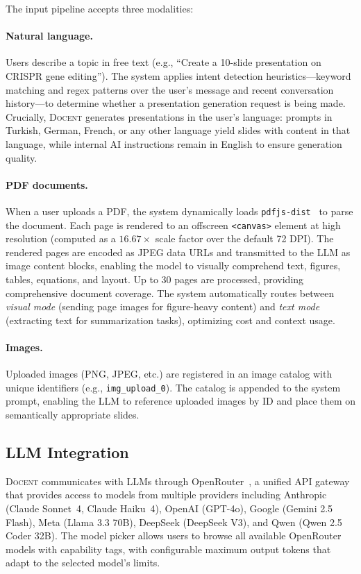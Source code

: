 \documentclass[11pt,a4paper]{article}
\newcommand{\system}{\textsc{Docent}\xspace}
\begin{document}
The input pipeline accepts three modalities:

\paragraph{Natural language.}
Users describe a topic in free text (e.g., ``Create a 10-slide presentation on CRISPR gene editing'').
The system applies intent detection heuristics---keyword matching and regex patterns over the user's message and recent conversation history---to determine whether a presentation generation request is being made.
Crucially, \system generates presentations in the user's language: prompts in Turkish, German, French, or any other language yield slides with content in that language, while internal AI instructions remain in English to ensure generation quality.

\paragraph{PDF documents.}
When a user uploads a PDF, the system dynamically loads \texttt{pdfjs-dist}~\citep{pdfjs2024} to parse the document.
Each page is rendered to an offscreen \texttt{<canvas>} element at high resolution (computed as a $16.67\times$ scale factor over the default 72 DPI).
The rendered pages are encoded as JPEG data URLs and transmitted to the LLM as image content blocks, enabling the model to visually comprehend text, figures, tables, equations, and layout.
Up to 30 pages are processed, providing comprehensive document coverage.
The system automatically routes between \emph{visual mode} (sending page images for figure-heavy content) and \emph{text mode} (extracting text for summarization tasks), optimizing cost and context usage.

\paragraph{Images.}
Uploaded images (PNG, JPEG, etc.) are registered in an image catalog with unique identifiers (e.g., \texttt{img\_upload\_0}).
The catalog is appended to the system prompt, enabling the LLM to reference uploaded images by ID and place them on semantically appropriate slides.

\subsection{LLM Integration}

\system communicates with LLMs through OpenRouter~\citep{openrouter2024}, a unified API gateway that provides access to models from multiple providers including Anthropic (Claude Sonnet~4, Claude Haiku~4), OpenAI (GPT-4o), Google (Gemini 2.5 Flash), Meta (Llama 3.3 70B), DeepSeek (DeepSeek V3), and Qwen (Qwen 2.5 Coder 32B).
The model picker allows users to browse all available OpenRouter models with capability tags, with configurable maximum output tokens that adapt to the selected model's limits.
\end{document}
